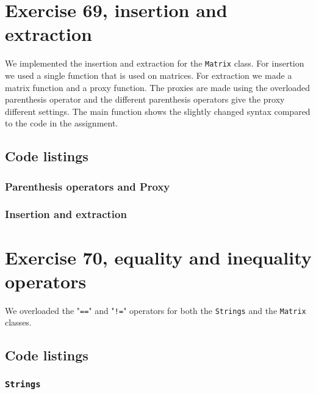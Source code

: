 \documentclass[11pt]{article}
\begin{document}
\section*{Exercise 69, insertion and extraction}
We implemented the insertion and extraction for the \texttt{Matrix} class.
For insertion we used a single function that is used on matrices.
For extraction we made a matrix function and a proxy function.
The proxies are made using the overloaded parenthesis operator and the different parenthesis operators give the proxy different settings.
The main function shows the slightly changed syntax compared to the code in the assignment.

\subsection*{Code listings}


\subsubsection*{Parenthesis operators and Proxy}






\subsubsection*{Insertion and extraction}




\section*{Exercise 70, equality and inequality operators}
We overloaded the "\texttt{==}" and "\texttt{!=}" operators for both the \texttt{Strings} and the \texttt{Matrix} classes.

\subsection*{Code listings}
\subsubsection*{\texttt{Strings}}



\end{document}
